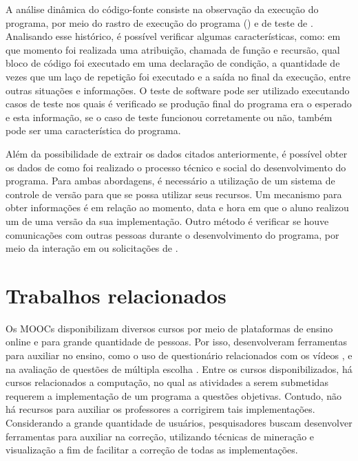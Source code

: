 			A análise dinâmica do código-fonte consiste na observação da execução do
			programa, por meio do rastro de execução do programa () e
			de teste de . Analisando esse histórico, é possível
			verificar algumas características, como: em que momento foi realizada
			uma atribuição, chamada de função e recursão, qual bloco de código foi
			executado em uma declaração de condição, a quantidade de vezes que um laço
			de repetição foi executado e a saída no final da execução, entre outras situações
			e informações. O teste de software pode ser utilizado executando casos de teste
			nos quais é verificado se produção final do programa era o esperado e esta
			informação, se o caso de teste funcionou corretamente ou não, também pode
			ser uma característica do programa.
			
			Além da possibilidade de extrair os dados citados anteriormente, é possível
			obter os dados de como foi realizado o processo técnico e social do desenvolvimento
			do programa. Para ambas abordagens, é necessário a utilização de um sistema de
			controle de versão para que se possa utilizar seus recursos. Um mecanismo para
			obter informações é em relação ao momento, data e hora em que o aluno realizou
			um  de uma versão da sua implementação. Outro método é verificar
			se houve comunicações com outras pessoas durante o desenvolvimento do programa,
			por meio da interação em  ou solicitações de .
			

	\section{Trabalhos relacionados}
	\label{sec:TrabRel}
	
		Os \acs{MOOC}s disponibilizam diversos cursos por meio de plataformas de ensino
		online e para grande quantidade de pessoas. Por isso, desenvolveram ferramentas
		para auxiliar no ensino, como o uso de questionário relacionados com os vídeos
		\cite{fassbinder2014}, e na avaliação de questões de múltipla escolha \cite{alario2013analysing}.
		Entre os cursos disponibilizados, há cursos relacionados a computação, no qual
		as atividades a serem submetidas requerem a implementação de um programa a
		questões objetivas. Contudo, não há recursos para auxiliar os professores
		a corrigirem tais implementações. Considerando a grande quantidade de usuários,
		pesquisadores buscam desenvolver ferramentas para auxiliar na correção,
		utilizando técnicas de mineração e visualização a fim de facilitar a correção
		de todas as implementações.
	
